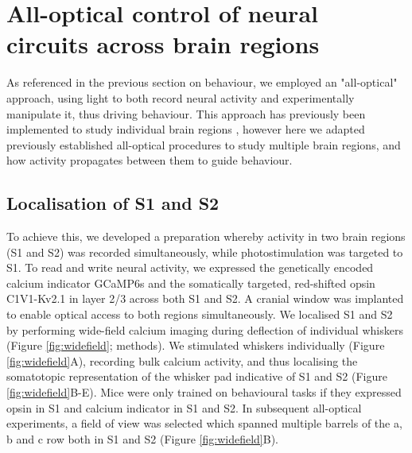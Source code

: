 \chapter{\label{res2}All-optical control of neural circuits across brain regions}

\minitoc

As referenced in the previous section on behaviour, we employed an "all-optical" approach, using light to both record neural activity and experimentally manipulate it, thus driving behaviour. This approach has previously been implemented to study individual brain regions \cite{dalgleish_how_2020, gill_precise_2020, russell_influence_2019, daie_targeted_2021, marshel_cortical_2019}, however here we adapted previously established all-optical procedures to study multiple brain regions, and how activity propagates between them to guide behaviour. 

\section{Localisation of S1 and S2}

To achieve this, we developed a preparation whereby activity in two brain regions (S1 and S2) was recorded simultaneously, while photostimulation was targeted to S1. To read and write neural activity, we expressed the genetically encoded calcium indicator GCaMP6s \cite{chen_ultrasensitive_2013} and the somatically targeted, red-shifted opsin C1V1-Kv2.1 \cite{yizhar_neocortical_2011, chettih_single-neuron_2019} in layer 2/3 across both S1 and S2. A cranial window was implanted to enable optical access to both regions simultaneously. We localised S1 and S2 by performing wide-field calcium imaging during deflection of individual whiskers (Figure \ref{fig:widefield}; methods). We stimulated whiskers individually (Figure \ref{fig:widefield}A), recording bulk calcium activity, and thus localising the somatotopic representation of the whisker pad indicative of S1 and S2 (Figure \ref{fig:widefield}B-E). Mice were only trained on behavioural tasks if they expressed opsin in S1 and calcium indicator in S1 and S2. In subsequent all-optical experiments, a field of view was selected which spanned multiple barrels of the a, b and c row both in S1 and S2 (Figure \ref{fig:widefield}B).


